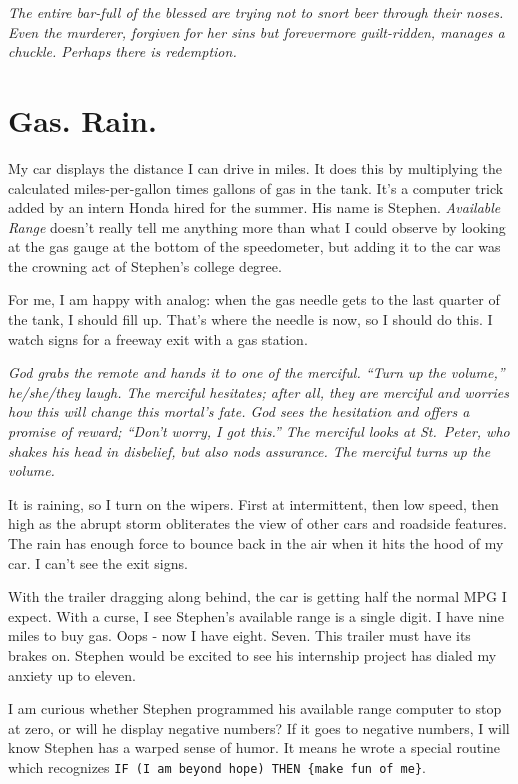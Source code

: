 \documentclass[
  letterpaper,
  DIV=11,
  numbers=noendperiod]{scrreprt}
\begin{document}
\emph{The entire bar-full of the blessed are trying not to snort beer
through their noses. Even the murderer, forgiven for her sins but
forevermore guilt-ridden, manages a chuckle. Perhaps there is
redemption.}

\section*{Gas. Rain.}\label{gas.-rain.}


My car displays the distance I can drive in miles. It does this by
multiplying the calculated miles-per-gallon times gallons of gas in the
tank. It's a computer trick added by an intern Honda hired for the
summer. His name is Stephen. \emph{Available Range} doesn't really tell
me anything more than what I could observe by looking at the gas gauge
at the bottom of the speedometer, but adding it to the car was the
crowning act of Stephen's college degree.

For me, I am happy with analog: when the gas needle gets to the last
quarter of the tank, I should fill up. That's where the needle is now,
so I should do this. I watch signs for a freeway exit with a gas
station.

\emph{God grabs the remote and hands it to one of the merciful. ``Turn
up the volume,'' he/she/they laugh. The merciful hesitates; after all,
they are merciful and worries how this will change this mortal's fate.
God sees the hesitation and offers a promise of reward; ``Don't worry, I
got this.'' The merciful looks at St.~Peter, who shakes his head in
disbelief, but also nods assurance. The merciful turns up the volume.}

It is raining, so I turn on the wipers. First at intermittent, then low
speed, then high as the abrupt storm obliterates the view of other cars
and roadside features. The rain has enough force to bounce back in the
air when it hits the hood of my car. I can't see the exit signs.

With the trailer dragging along behind, the car is getting half the
normal MPG I expect. With a curse, I see Stephen's available range is a
single digit. I have nine miles to buy gas. Oops - now I have eight.
Seven. This trailer must have its brakes on. Stephen would be excited to
see his internship project has dialed my anxiety up to eleven.

I am curious whether Stephen programmed his available range computer to
stop at zero, or will he display negative numbers? If it goes to
negative numbers, I will know Stephen has a warped sense of humor. It
means he wrote a special routine which recognizes
\texttt{IF\ (I\ am\ beyond\ hope)\ THEN\ \{make\ fun\ of\ me\}}.
\end{document}
